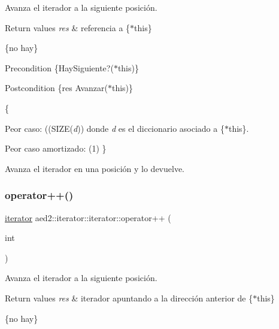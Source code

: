 Avanza el iterador a la siguiente posición. 


\begin{DoxyRetVals}{Return values}
{\em res} & referencia a \{$\ast$this\}\\
\hline
\end{DoxyRetVals}
\{no hay\}

\begin{DoxyPrecond}{Precondition}
\{Hay\+Siguiente?($\ast$this)\} 
\end{DoxyPrecond}
\begin{DoxyPostcond}{Postcondition}
\{res  Avanzar($\ast$this)\}
\end{DoxyPostcond}
\{
\begin{DoxyItemize}
\item Peor caso\+: ((S\+I\+ZE({\itshape d})) donde {\itshape d} es el diccionario asociado a \{$\ast$this\}.
\item Peor caso amortizado\+: (1) \}
\end{DoxyItemize}

Avanza el iterador en una posición y lo devuelve. \mbox{\label{classaed2_1_1iterator_1_1iterator_aa2023454f3ce45f7da4ef23d7a7f6749}} 
\subsubsection{\texorpdfstring{operator++()}{operator++()}\hspace{0.1cm}{\footnotesize\ttfamily [2/2]}}
{\footnotesize\ttfamily \hyperlink{classaed2_1_1iterator_1_1iterator}{iterator} aed2\+::iterator\+::iterator\+::operator++ (\begin{DoxyParamCaption}\item[{int}]{ }\end{DoxyParamCaption})\hspace{0.3cm}{\ttfamily [inline]}}



Avanza el iterador a la siguiente posición. 


\begin{DoxyRetVals}{Return values}
{\em res} & iterador apuntando a la dirección anterior de \{$\ast$this\}\\
\hline
\end{DoxyRetVals}
\{no hay\}

